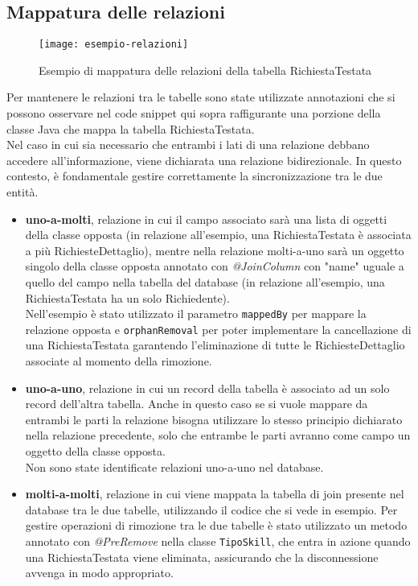 \subsection{Mappatura delle relazioni}
\begin{figure}[H] 
    \centering 
    \texttt{[image: esempio-relazioni]} 
    \caption{Esempio di mappatura delle relazioni della tabella RichiestaTestata}
\end{figure}
\noindent Per mantenere le relazioni tra le tabelle sono state utilizzate annotazioni che si possono osservare nel code snippet qui sopra raffigurante una porzione della classe Java che mappa la tabella RichiestaTestata.\\
Nel caso in cui sia necessario che entrambi i lati di una relazione debbano accedere all'informazione, viene dichiarata una relazione bidirezionale. In questo contesto, è fondamentale gestire correttamente la sincronizzazione tra le due entità.
\begin{itemize}
\item \textbf{uno-a-molti}, relazione in cui il campo associato sarà una lista di oggetti della classe opposta (in relazione all'esempio, una RichiestaTestata è associata a più RichiesteDettaglio), mentre nella relazione molti-a-uno sarà un oggetto singolo della classe opposta annotato con \textit{@JoinColumn} con "name" uguale a quello del campo nella tabella del database (in relazione all'esempio, una RichiestaTestata ha un solo Richiedente).\\
Nell'esempio è stato utilizzato il parametro \texttt{mappedBy} per mappare la relazione opposta e \texttt{orphanRemoval} per poter implementare la cancellazione di una RichiestaTestata garantendo l'eliminazione di tutte le RichiesteDettaglio associate al momento della rimozione.
\item \textbf{uno-a-uno}, relazione in cui un record della tabella è associato ad un solo record dell'altra tabella. Anche in questo caso se si vuole mappare da entrambi le parti la relazione bisogna utilizzare lo stesso principio dichiarato nella relazione precedente, solo che entrambe le parti avranno come campo un oggetto della classe opposta.\\
Non sono state identificate relazioni uno-a-uno nel database.
\item \textbf{molti-a-molti}, relazione in cui viene mappata la tabella di join presente nel database tra le due tabelle, utilizzando il codice che si vede in esempio.
Per gestire operazioni di rimozione tra le due tabelle è stato utilizzato un metodo annotato con \textit{@PreRemove} nella classe \texttt{TipoSkill}, che entra in azione quando una RichiestaTestata viene eliminata, assicurando che la disconnessione avvenga in modo appropriato.
\end{itemize}
